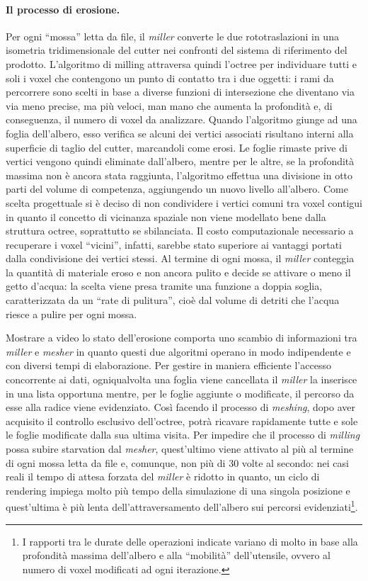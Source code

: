 \paragraph{Il processo di erosione.}
Per ogni ``mossa'' letta da file, il \emph{miller} converte le due rototraslazioni in una isometria tridimensionale del cutter nei confronti del sistema di riferimento del prodotto.  L'algoritmo di milling attraversa quindi l'octree per individuare tutti e soli i voxel che contengono un punto di contatto tra i due oggetti: i rami da percorrere sono scelti in base a diverse funzioni di intersezione che diventano via via meno precise, ma più veloci, man mano che aumenta la profondità e, di conseguenza, il numero di voxel da analizzare. Quando l'algoritmo giunge ad una foglia dell'albero, esso verifica se alcuni dei vertici associati risultano interni alla superficie di taglio del cutter, marcandoli come erosi. Le foglie rimaste prive di vertici vengono quindi eliminate dall'albero, mentre per le altre, se la profondità massima non è ancora stata raggiunta, l'algoritmo effettua una divisione in otto parti del volume di competenza, aggiungendo un nuovo livello all'albero. Come scelta progettuale si è deciso di non condividere i vertici comuni tra voxel contigui in quanto il concetto di vicinanza spaziale non viene modellato bene dalla struttura octree, soprattutto se sbilanciata. Il costo computazionale necessario a recuperare i voxel ``vicini'', infatti, sarebbe stato superiore ai vantaggi portati dalla condivisione dei vertici stessi. Al termine di ogni mossa, il \emph{miller} conteggia la quantità di materiale eroso e non ancora pulito e decide se attivare o meno il getto d'acqua: la scelta viene presa tramite una funzione a doppia soglia, caratterizzata da un ``rate di pulitura'', cioè dal volume di detriti che l'acqua riesce a pulire per ogni mossa.

Mostrare a video lo stato dell'erosione comporta uno scambio di informazioni tra \emph{miller} e \emph{mesher} in quanto questi due algoritmi operano in modo indipendente e con diversi tempi di elaborazione. Per gestire in maniera efficiente l'accesso concorrente ai dati, ogniqualvolta una foglia viene cancellata il \emph{miller} la inserisce in una lista opportuna mentre, per le foglie aggiunte o modificate, il percorso da esse alla radice viene evidenziato. Così facendo il processo di \emph{meshing}, dopo aver acquisito il controllo esclusivo dell'octree, potrà ricavare rapidamente tutte e sole le foglie modificate dalla sua ultima visita. Per impedire che il processo di \emph{milling} possa subire starvation dal \emph{mesher}, quest'ultimo viene attivato al più al termine di ogni mossa letta da file e, comunque, non più di 30 volte al secondo: nei casi reali il tempo di attesa forzata del \emph{miller} è ridotto in quanto, un ciclo di rendering impiega molto più tempo della simulazione di una singola posizione e quest'ultima è più lenta dell'attraversamento dell'albero sui percorsi evidenziati\footnote{I rapporti tra le durate delle operazioni indicate variano di molto in base alla profondità massima dell'albero e alla ``mobilità'' dell'utensile, ovvero al numero di voxel modificati ad ogni iterazione.}.

